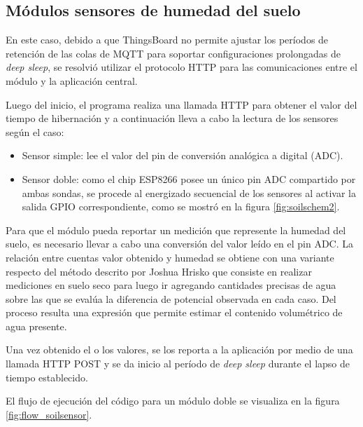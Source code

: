 \subsection{Módulos sensores de humedad del suelo}
\label{Firmware módulos sensores de humedad del suelo}



En este caso, debido a que ThingsBoard no permite ajustar los períodos de retención de las colas de MQTT para soportar configuraciones prolongadas de \textit{deep sleep}, se resolvió utilizar el protocolo HTTP para las comunicaciones entre el módulo y la aplicación central. 

Luego del inicio, el programa realiza una llamada HTTP para obtener el valor del tiempo de hibernación y a continuación lleva a cabo la lectura de los sensores según el caso:
\begin{itemize}
\item Sensor simple: lee el valor del pin de conversión analógica a digital (ADC).
\item Sensor doble: como el chip ESP8266 posee un único pin ADC compartido por ambas sondas, se procede al energizado secuencial de los sensores al activar la salida GPIO correspondiente, como se mostró en la figura \ref{fig:soilschem2}. 

\end{itemize}


Para que el módulo pueda reportar un medición que represente la humedad del suelo, es necesario llevar a cabo una conversión del valor leído en el pin ADC. La relación entre cuentas valor obtenido y humedad se obtiene con una variante respecto del método descrito por Joshua Hrisko \citep{soilcalibration} que consiste en realizar mediciones en suelo seco para luego ir agregando cantidades precisas de agua sobre las que se evalúa la diferencia de potencial observada en cada caso. Del proceso resulta una expresión que permite estimar el contenido volumétrico de agua presente.

Una vez obtenido el o los valores, se los reporta a la aplicación por medio de una llamada HTTP POST y se da inicio al período de \textit{deep sleep} durante el lapso de tiempo establecido.

El flujo de ejecución del código para un módulo doble se visualiza en la figura \ref{fig:flow_soilsensor}.


